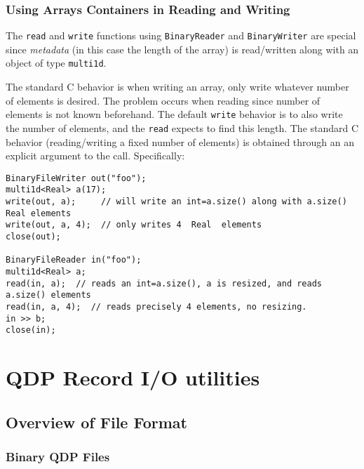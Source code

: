 \documentclass[12pt,letterpaper]{article}
\begin{document}
\subsubsection{Using Arrays Containers in Reading and Writing}

The \verb|read| and \verb|write| functions using \verb|BinaryReader|
and \verb|BinaryWriter| are special since {\em metadata} (in this case
the length of the array) is read/written along with an object of type
\verb|multi1d|. 

The standard C behavior is when writing an array, only write whatever
number of elements is desired. The problem occurs when reading since
number of elements is not known beforehand. The default \verb|write| behavior
is to also write the number of elements, and the \verb|read| expects
to find this length. The standard C behavior (reading/writing a fixed
number of elements) is obtained through an an explicit argument to the call.
Specifically:
%
\begin{small}
\begin{verbatim}
BinaryFileWriter out("foo");
multi1d<Real> a(17);
write(out, a);     // will write an int=a.size() along with a.size() Real elements
write(out, a, 4);  // only writes 4  Real  elements 
close(out);

BinaryFileReader in("foo");
multi1d<Real> a;
read(in, a);  // reads an int=a.size(), a is resized, and reads a.size() elements
read(in, a, 4);  // reads precisely 4 elements, no resizing.
in >> b;
close(in);
\end{verbatim}
\end{small}



\newpage

\section{QDP Record I/O utilities}
\label{sec:qio}

\subsection{Overview of File Format}
\label{sec.fileformat}

\subsubsection{Binary QDP Files}
\end{document}
